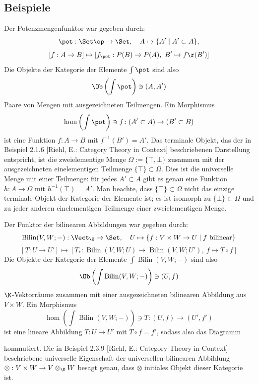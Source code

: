 \documentclass[11pt]{article}
\newcommand{\book}{[Riehl, E.: Category Theory in Context] }
\begin{document}
\subsection{Beispiele}
\begin{example} Der Potenzmengenfunktor war gegeben durch:
$$\pot:\Set\op \to \Set,\quad  A\mapsto \{A'\mid A'\subset A\},$$
$$[f: A\to B]\mapsto [f_\pot: P(B)\to P(A),\  B'\mapsto f\r (B')]$$
Die Objekte der Kategorie der Elemente $\int \pot$ sind also
$$\Ob\left(\int \pot\right) \ni (A,A')$$
Paare von Mengen mit ausgezeichneten Teilmengen.
Ein Morphismus 
$$\hom \left(\int \pot \right)\ni f \colon (A' \subset A) \to (B' \subset B)$$ ist eine 
Funktion $f \colon A \to B$ mit $f^{-1}(B') = A'$. Das 
terminale Objekt, das der in Beispiel 2.1.6 \book beschriebenen 
Darstellung entspricht, ist die zweielementige Menge 
$\Omega :=\{\top, \bot\}$ zusammen mit der 
ausgezeichneten einelementigen Teilmenge $\{\top\} \subset \Omega$. 
Dies ist die universelle Menge mit einer Teilmenge: für jedes 
$A' \subset A$ gibt es genau eine Funktion $h \colon A \to \Omega$ 
mit $h^{-1}(\top) = A'$. Man beachte, dass $\{\top\} \subset \Omega$ 
nicht das einzige terminale Objekt der Kategorie der Elemente 
ist; es ist isomorph zu $\{\bot\} \subset \Omega$ und zu jeder 
anderen einelementigen Teilmenge einer zweielementigen Menge.
\end{example}


\begin{example}
Der Funktor der bilinearen Abbildungen war gegeben durch:
$$\operatorname{Bilin}(V,W;-) : \Vect_\K \to \Set, \quad U \mapsto \{f : V \times W \to U \mid f \text{ bilinear}\}$$
$$[T : U \to U'] \mapsto [T_\ast : \operatorname{Bilin}(V,W;U) \to \operatorname{Bilin}(V,W;U'),\ f \mapsto T \circ f]$$
Die Objekte der Kategorie der Elemente $\int \operatorname{Bilin}(V,W;-)$ sind also
$$\Ob\left(\int \operatorname{Bilin}(V,W;-)\right) \ni (U, f)$$
$\K$-Vektorräume zusammen mit einer ausgezeichneten bilinearen Abbildung 
aus $V \times W$.
Ein Morphismus
$$\hom\left(\int \operatorname{Bilin}(V,W;-)\right) \ni T \colon (U, f) \to (U', f')$$
ist eine lineare Abbildung $T : U \to U'$ mit $T \circ f = f'$, sodass also 
das Diagramm
\begin{figure}[h]
    \centering
{}
\end{figure}
kommutiert. Die in Beispiel 2.3.9 \book beschriebene universelle Eigenschaft 
der universellen bilinearen Abbildung $\otimes : V \times W \to V \otimes_\K W$ 
besagt genau, dass $\otimes$ initiales Objekt dieser Kategorie ist.
\end{example}
\end{document}
